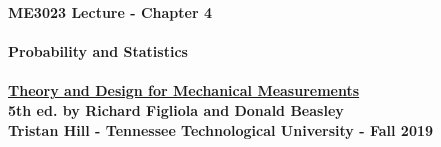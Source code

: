 \documentclass[11pt]{article}
\newcommand{\NUM}{4}
\begin{document}
\textbf{ \LARGE ME3023 Lecture -  Chapter \NUM \\\\ \hspace*{5mm} Probability and Statistics} \\\\
\textbf{ \hspace*{5mm}\underline{Theory and Design for Mechanical Measurements}\vspace{1mm}\\ 
                \hspace*{5mm} 5th ed. by Richard Figliola and Donald Beasley}\vspace{3mm}\\
\textbf{ \hspace*{5mm}Tristan Hill - Tennessee Technological University - Fall 2019} \vspace{3mm}\\
\end{document}
